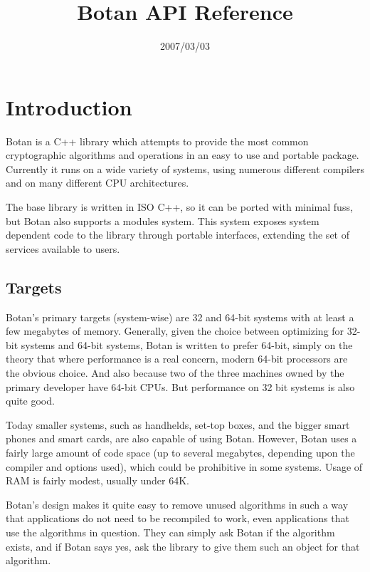 \documentclass{article}
\title{\textbf{Botan API Reference}}
\author{}
\date{2007/03/03}
\begin{document}
\maketitle

\tableofcontents

\parskip=5pt

\pagebreak
\section{Introduction}

Botan is a C++ library which attempts to provide the most common cryptographic
algorithms and operations in an easy to use and portable package. Currently it
runs on a wide variety of systems, using numerous different compilers and on
many different CPU architectures.

The base library is written in ISO C++, so it can be ported with
minimal fuss, but Botan also supports a modules system. This system
exposes system dependent code to the library through portable
interfaces, extending the set of services available to users.

\subsection{Targets}

Botan's primary targets (system-wise) are 32 and 64-bit systems with
at least a few megabytes of memory. Generally, given the choice
between optimizing for 32-bit systems and 64-bit systems, Botan is
written to prefer 64-bit, simply on the theory that where performance
is a real concern, modern 64-bit processors are the obvious
choice. And also because two of the three machines owned by the
primary developer have 64-bit CPUs. But performance on 32 bit systems
is also quite good.

Today smaller systems, such as handhelds, set-top boxes, and the
bigger smart phones and smart cards, are also capable of using
Botan. However, Botan uses a fairly large amount of code space (up to
several megabytes, depending upon the compiler and options used),
which could be prohibitive in some systems. Usage of RAM is fairly
modest, usually under 64K.

Botan's design makes it quite easy to remove unused algorithms in such a way
that applications do not need to be recompiled to work, even applications that
use the algorithms in question. They can simply ask Botan if the algorithm
exists, and if Botan says yes, ask the library to give them such an object for
that algorithm.
\end{document}

